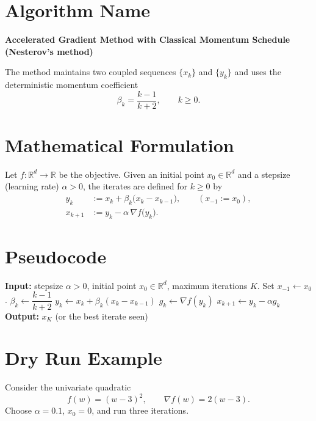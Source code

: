 \documentclass{article}
\newcommand{\grad}{\nabla}
\begin{document}
\section*{Algorithm Name}
\textbf{Accelerated Gradient Method with Classical Momentum Schedule (Nesterov’s method)}  

The method maintains two coupled sequences $\{x_k\}$ and $\{y_k\}$ and uses the deterministic momentum coefficient  
\[
\beta_k=\frac{k-1}{k+2},\qquad k\ge 0 .
\]

\section*{Mathematical Formulation}
Let $f:\mathbb{R}^d\to\mathbb{R}$ be the objective.  
Given an initial point $x_0\in\mathbb{R}^d$ and a stepsize (learning rate) $\alpha>0$, the iterates are defined for $k\ge 0$ by  
\[
\boxed{
\begin{aligned}
y_k &:= x_k+\beta_k\bigl(x_k-x_{k-1}\bigr), \qquad (x_{-1}:=x_0) ,\\[4pt]
x_{k+1} &:= y_k-\alpha \,\grad f\!\bigl(y_k\bigr).
\end{aligned}}
\tag{1}
\]

\section*{Pseudocode}
\begin{algorithm}[H]
\caption{Accelerated Gradient (AG) with $\beta_k=\frac{k-1}{k+2}$}
\begin{algorithmic}[1]
\State \textbf{Input:} stepsize $\alpha>0$, initial point $x_0\in\mathbb{R}^d$, maximum iterations $K$.
\State Set $x_{-1}\gets x_0$.
    \State $\beta_k\gets \dfrac{k-1}{k+2}$ 
    \State $y_k \gets x_k + \beta_k (x_k-x_{k-1})$ 
    \State $g_k \gets \grad f(y_k)$ 
    \State $x_{k+1} \gets y_k - \alpha g_k$ 
\EndFor
\State \textbf{Output:} $x_K$ (or the best iterate seen)
\end{algorithmic}
\end{algorithm}

\section*{Dry Run Example}
Consider the univariate quadratic  
\[
f(w)=(w-3)^2,\qquad \grad f(w)=2(w-3).
\]
Choose $\alpha=0.1$, $x_0=0$, and run three iterations.
\end{document}
